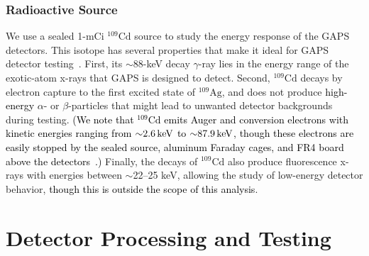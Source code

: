 \documentclass[journal]{IEEEtran}
\newcommand{\red}[1]{\textcolor{black}{#1}}
\begin{document}
\subsubsection{Radioactive Source} 
We use a sealed 1-mCi $^{109}\text{Cd}$ source to study the energy response of the GAPS detectors. This isotope has several properties that make it ideal for GAPS detector testing~\cite{KUMAR20161}. First, its ${\sim}$88-keV decay $\gamma$-ray lies in the energy range of the exotic-atom x-rays that GAPS is designed to detect. Second, $^{109}\text{Cd}$ decays by electron capture to the first excited state of $^{109}\text{Ag}$, and does not produce \red{high-energy} $\alpha$- or $\beta$-particles that might lead to unwanted detector backgrounds during testing. \red{(We note that $^{109}\text{Cd}$ emits Auger and conversion electrons with kinetic energies ranging from ${\sim}2.6\text{\,keV}$ to ${\sim}87.9\text{\,keV}$, though these electrons are easily stopped by the sealed source, aluminum Faraday cages, and FR4 board above the detectors~\cite{estar}.)} Finally, the decays of $^{109}\text{Cd}$ also produce fluorescence x-rays with energies between ${\sim}$22--25 keV, allowing the study of low-energy detector behavior, \red{though this is outside the scope of this analysis}.
%

\section{{\label{sec:testing_flow}}Detector Processing and Testing}
%
\end{document}
